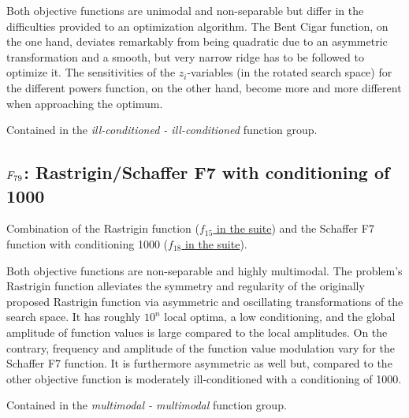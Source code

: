 Both objective functions are unimodal and non-separable but differ in the
difficulties provided to an optimization algorithm.
The Bent Cigar function, on the one hand, deviates remarkably
from being quadratic due to an asymmetric transformation and a smooth,
but very narrow ridge has to be followed to optimize it.
The sensitivities of the
\(z_i\)-variables (in the rotated search space)
for the different powers function, on the other hand,
become more and more different when
approaching the optimum.

Contained in the \emph{ill-conditioned - ill-conditioned} function group.



\subsection[\texorpdfstring{\protect\(F_{79}\protect\): Rastrigin/Schaffer F7 with conditioning of 1000}{F79: Rastrigin/Schaffer F7 with conditioning of 1000}]{\texorpdfstring{\protect\(F_{79}\protect\): Rastrigin/Schaffer F7 with conditioning of 1000}{}}
\label{index:rastrigin-schaffer-f7-with-conditioning-of-1000}\label{index:f79}
Combination of the Rastrigin function (\href{https://coco.gforge.inria.fr/downloads/download16.00/bbobdocfunctions.pdf\#page=75}{\(f_{15}\) in the \bbob suite}) and the
Schaffer F7 function with conditioning 1000 (\href{https://coco.gforge.inria.fr/downloads/download16.00/bbobdocfunctions.pdf\#page=90}{\(f_{18}\) in the \bbob suite}).

Both objective functions are non-separable and highly multimodal.
The problem's Rastrigin function alleviates the symmetry and regularity of
the originally proposed Rastrigin function via asymmetric and oscillating
transformations of the search space. It has roughly \(10^n\) local optima,
a low conditioning, and the global amplitude of function values is large
compared to the local amplitudes.
On the contrary, frequency  and  amplitude  of  the  function value modulation
vary for the Schaffer F7 function. It is furthermore asymmetric as well
but, compared to the other objective function is moderately ill-conditioned
with a conditioning of 1000.

Contained in the \emph{multimodal - multimodal} function group.



